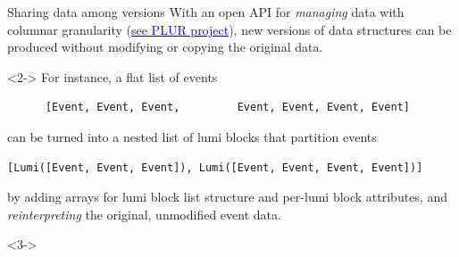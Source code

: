 \documentclass{beamer}
\begin{document}
\begin{frame}[fragile]{Sharing data among versions}
\vspace{0.5 cm}
With an open API for {\it managing} data with columnar granularity (\href{https://github.com/diana-hep/plur}{\textcolor{blue}{see PLUR project}}), new versions of data structures can be produced without modifying or copying the original data.

\vspace{0.5 cm}
\begin{uncoverenv}<2->
For instance, a flat list of events

{\scriptsize\begin{verbatim}
      [Event, Event, Event,         Event, Event, Event, Event]
\end{verbatim}}

can be turned into a nested list of lumi blocks that partition events

{\scriptsize\begin{verbatim}
[Lumi([Event, Event, Event]), Lumi([Event, Event, Event, Event])]
\end{verbatim}}

by adding arrays for lumi block list structure and per-lumi block attributes, and {\it reinterpreting} the original, unmodified event data.
\end{uncoverenv}

\vspace{0.5 cm}
\begin{uncoverenv}<3->
\end{uncoverenv}
\end{frame}
\end{document}

